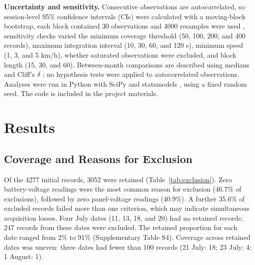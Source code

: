 \documentclass[vehicles,article,submit,moreauthors]{Definitions/mdpi}
\begin{document}
\textbf{Uncertainty and sensitivity.} Consecutive observations are autocorrelated, so session-level 95\% confidence intervals (CIs) were calculated with a moving-block bootstrap, each block contained 30 observations and 4000 resamples were used \citep{ref-kunsch}, sensitivity checks varied the minimum coverage threshold (50, 100, 200, and 400 records), maximum integration interval (10, 30, 60, and 120 s), minimum speed (1, 3, and 5 km/h), whether saturated observations were excluded, and block length (15, 30, and 60). Between-month comparisons are described using medians and Cliff's $\delta$ \citep{ref-cliff}; no hypothesis tests were applied to autocorrelated observations. Analyses were run in Python with SciPy and statsmodels \citep{ref-scipy,ref-statsmodels}, using a fixed random seed. The code is included in the project materials.

\section{Results}

\subsection{Coverage and Reasons for Exclusion}

Of the 4277 initial records, 3052 were retained (Table~\ref{tab:exclusion}). Zero battery-voltage readings were the most common reason for exclusion (46.7\% of exclusions), followed by zero panel-voltage readings (40.9\%). A further 35.6\% of excluded records failed more than one criterion, which may indicate simultaneous acquisition losses. Four July dates (11, 13, 18, and 20) had no retained records; 247 records from these dates were excluded. The retained proportion for each date ranged from 2\% to 91\% (Supplementary Table S4). Coverage across retained dates was uneven: three dates had fewer than 100 records (21 July: 18; 23 July: 4; 1 August: 1).
\end{document}
